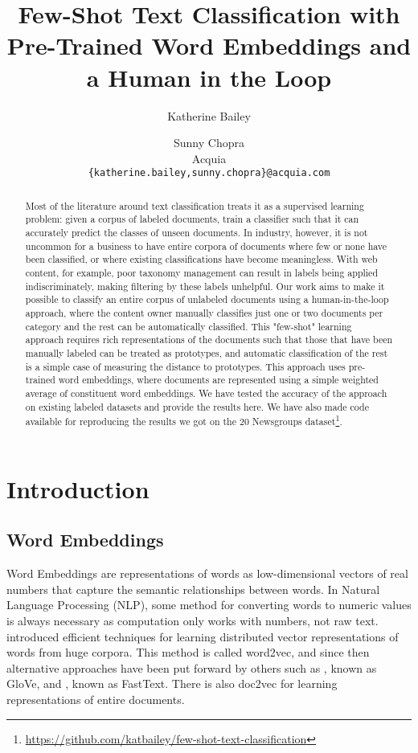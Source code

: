 \documentclass{article} %
\title{Few-Shot Text Classification with Pre-Trained Word Embeddings and a Human in the Loop}
\author{Katherine Bailey \and Sunny Chopra \\
  Acquia \\
  \texttt{\{katherine.bailey,sunny.chopra\}@acquia.com}
}
\date{}
\begin{document}
\maketitle

\begin{abstract}
Most of the literature around text classification treats it as a supervised learning problem: given a corpus of labeled documents, train a classifier such that it can accurately predict the classes of unseen documents. In industry, however, it is not uncommon for a business to have entire corpora of documents where few or none have been classified, or where existing classifications have become meaningless. With web content, for example, poor taxonomy management can result in labels being applied indiscriminately, making filtering by these labels unhelpful. Our work aims to make it possible to classify an entire corpus of unlabeled documents using a human-in-the-loop approach, where the content owner manually classifies just one or two documents per category and the rest can be automatically classified. This "few-shot" learning approach requires rich representations of the documents such that those that have been manually labeled can be treated as prototypes, and automatic classification of the rest is a simple case of measuring the distance to prototypes. This approach uses pre-trained word embeddings, where documents are represented using a simple weighted average of constituent word embeddings. We have tested the accuracy of the approach on existing labeled datasets and provide the results here. We have also made code available for reproducing the results we got on the 20 Newsgroups dataset\footnote{\url{https://github.com/katbailey/few-shot-text-classification}}.
\end{abstract}

\section{Introduction}

\subsection*{Word Embeddings}

Word Embeddings are representations of words as low-dimensional vectors of real numbers that capture the semantic relationships between words. In Natural Language Processing (NLP), some method for converting words to numeric values is always necessary as computation only works with numbers, not raw text. \citep{mikolov2013distributed} introduced efficient techniques for learning distributed vector representations of words from huge corpora. This method is called word2vec, and since then alternative approaches have been put forward by others such as \citep{pennington2014glove}, known as GloVe, and \citep{bojanowski2016subword}, known as FastText. There is also doc2vec for learning representations of entire documents.
\end{document}
